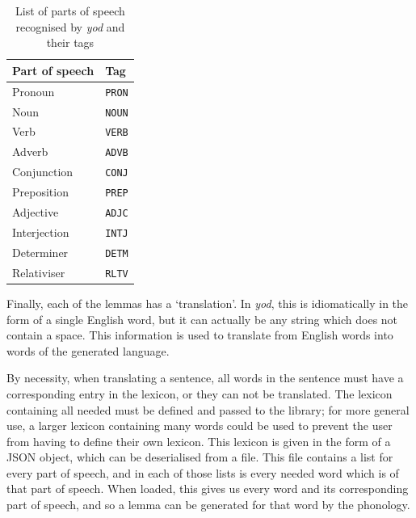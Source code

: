 \documentclass{report}
\begin{document}
	\begin{table}
		\caption{List of parts of speech recognised by \textit{yod} and their tags}
		\label{list of parts of speech}
		\centering
		\begin{tabular}{|l|l|} \hline
			\rowcolor[HTML]{D8D8D8} Part of speech & Tag  \\ \hline
			Pronoun        & \texttt{PRON} \\
			Noun           & \texttt{NOUN} \\
			Verb           & \texttt{VERB} \\
			Adverb         & \texttt{ADVB} \\
			Conjunction    & \texttt{CONJ} \\
			Preposition    & \texttt{PREP} \\
			Adjective      & \texttt{ADJC} \\
			Interjection   & \texttt{INTJ} \\
			Determiner     & \texttt{DETM} \\
			Relativiser    & \texttt{RLTV} \\ \hline
		\end{tabular}
	\end{table}
	
	Finally, each of the lemmas has a `translation'. In \textit{yod}, this is idiomatically in the form of a single English word, but it can actually be any string which does not contain a space. This information is used to translate from English words into words of the generated language.
	
	By necessity, when translating a sentence, all words in the sentence must have a corresponding entry in the lexicon, or they can not be translated. The lexicon containing all needed must be defined and passed to the library; for more general use, a larger lexicon containing many words could be used to prevent the user from having to define their own lexicon. This lexicon is given in the form of a JSON object, which can be deserialised from a file. This file contains a list for every part of speech, and in each of those lists is every needed word which is of that part of speech. When loaded, this gives us every word and its corresponding part of speech, and so a lemma can be generated for that word by the phonology.
	
\end{document}

